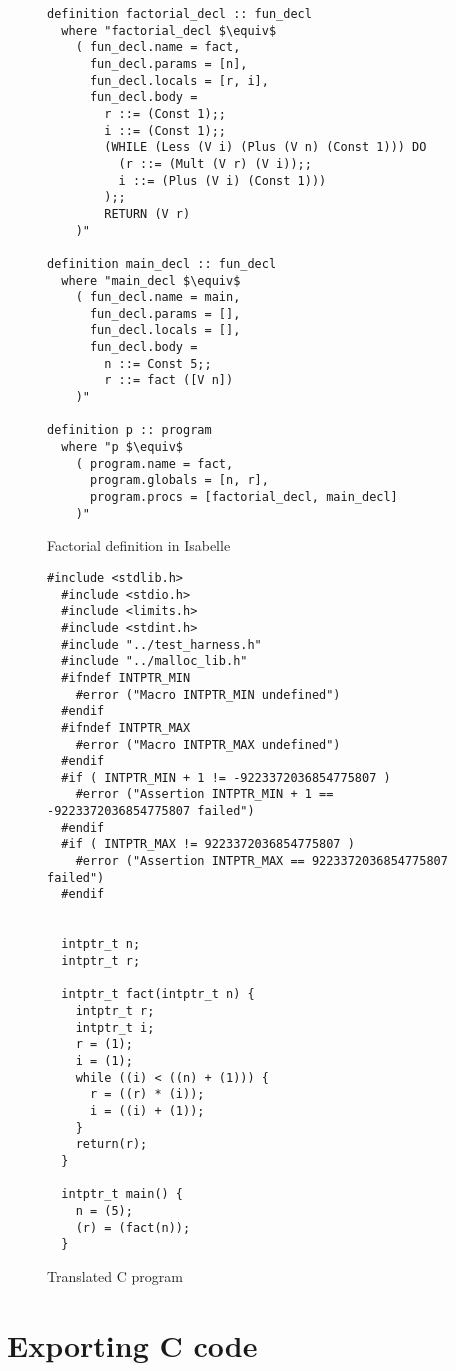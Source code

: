 \begin{figure}
\begin{lstlisting}[mathescape=true]
 definition factorial_decl :: fun_decl
  where "factorial_decl $\equiv$
    ( fun_decl.name = fact,
      fun_decl.params = [n],
      fun_decl.locals = [r, i],
      fun_decl.body =
        r ::= (Const 1);;
        i ::= (Const 1);;
        (WHILE (Less (V i) (Plus (V n) (Const 1))) DO
          (r ::= (Mult (V r) (V i));;
          i ::= (Plus (V i) (Const 1)))
        );;
        RETURN (V r)
    )"

definition main_decl :: fun_decl
  where "main_decl $\equiv$
    ( fun_decl.name = main,
      fun_decl.params = [],
      fun_decl.locals = [],
      fun_decl.body =
        n ::= Const 5;;
        r ::= fact ([V n])
    )"

definition p :: program
  where "p $\equiv$
    ( program.name = fact,
      program.globals = [n, r],
      program.procs = [factorial_decl, main_decl]
    )"
\end{lstlisting}
\caption{Factorial definition in Isabelle}
\label{fig:factorial_isabelle}
\end{figure}


\begin{figure}
\begin{lstlisting}[mathescape=true]
  #include <stdlib.h>
  #include <stdio.h>
  #include <limits.h>
  #include <stdint.h>
  #include "../test_harness.h"
  #include "../malloc_lib.h"
  #ifndef INTPTR_MIN
    #error ("Macro INTPTR_MIN undefined")
  #endif
  #ifndef INTPTR_MAX
    #error ("Macro INTPTR_MAX undefined")
  #endif
  #if ( INTPTR_MIN + 1 != -9223372036854775807 )
    #error ("Assertion INTPTR_MIN + 1 == -9223372036854775807 failed")
  #endif
  #if ( INTPTR_MAX != 9223372036854775807 )
    #error ("Assertion INTPTR_MAX == 9223372036854775807 failed")
  #endif


  intptr_t n;
  intptr_t r;

  intptr_t fact(intptr_t n) {
    intptr_t r;
    intptr_t i;
    r = (1);
    i = (1);
    while ((i) < ((n) + (1))) {
      r = ((r) * (i));
      i = ((i) + (1));
    }
    return(r);
  }

  intptr_t main() {
    n = (5);
    (r) = (fact(n));
  }
\end{lstlisting}
\caption{Translated C program}
\label{fig:factorial_c}
\end{figure}

\section{Exporting C code}

